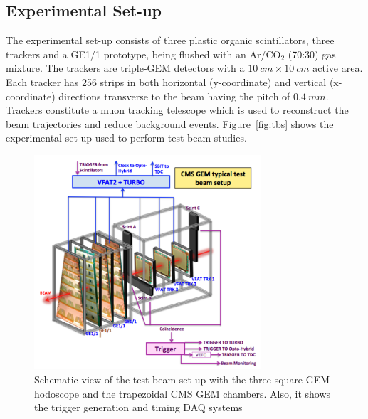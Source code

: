 \subsection{Experimental Set-up}
The experimental set-up consists of three plastic organic scintillators, three trackers and a GE1/1 prototype, being flushed with an Ar/CO$_{2}$ (70:30) gas mixture. The trackers are triple-GEM detectors with a $10~cm\times10~cm$ active area. Each tracker has 256 strips in both horizontal (y-coordinate) and vertical (x-coordinate) directions transverse to the beam having the pitch of $0.4~mm$. Trackers constitute a muon tracking telescope which is used to reconstruct the beam trajectories and reduce background events. Figure~\ref{fig:tbs} shows the experimental set-up used to perform test beam studies.
\begin{figure}[!htbp]
\centering
\includegraphics[width=0.75\textwidth]{figures/GEM/tb_exptsetup_copy.png}
\caption{Schematic view of the test beam set-up with the three square GEM hodoscope and the trapezoidal CMS GEM chambers. Also, it shows the trigger generation and timing DAQ systems}\label{fig:daq}
\end{figure}
